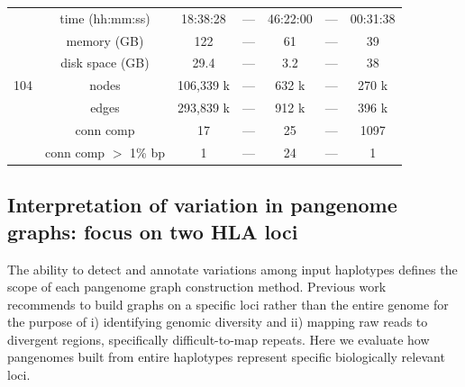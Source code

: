 \begin{table}
{\begin{tabular}{|c c c c c c c|}
			\hline\hline
			\multirow{7}{*}{104}  & time (hh:mm:ss)  &  18:38:28   &  ---  & 46:22:00  & --- & 00:31:38\\
			\cline{2-7}
			& memory (GB) & 122 &  ---  &  61 & --- & 39\\
			\cline{2-7}
			& disk space (GB)  &  29.4  & ---  &  3.2 & --- & 38\\
			\cline{2-7}
			&  nodes  & 106,339 k  &  ---  & 632 k & --- & 270 k\\
			\cline{2-7}
			&  edges  & 293,839 k  &  ---    & 912 k & --- & 396 k\\
			\cline{2-7}
			& conn comp   &  17  &   ---  & 25  & --- & 1097\\
			\cline{2-7}
			& conn comp $>$ 1\% bp &  1   & --- & 24 & --- & 1\\
			
			\hline
	\end{tabular}}
	\label{tab:computational_metrics}
\end{table}

\subsection*{\textbf{Interpretation of variation in pangenome graphs: focus on two HLA loci}}
\label{sec:loci}
The ability to detect and annotate variations among input haplotypes defines the scope of each pangenome graph construction method. Previous work~\cite{chin} recommends to build graphs on a specific loci rather than the entire genome for the purpose of i) identifying genomic diversity and ii) mapping raw reads to divergent regions, specifically difficult-to-map repeats. Here we evaluate how pangenomes built from entire haplotypes represent specific biologically relevant loci.


